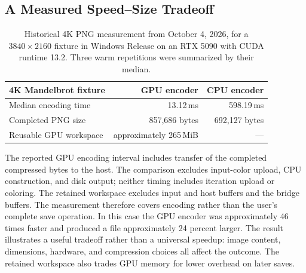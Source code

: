 \subsection{A Measured Speed--Size Tradeoff}
\label{subsec:png-benchmarks}

\begin{table}[htbp]
\centering
\begin{tabular}{lrr}
\hline
4K Mandelbrot fixture & GPU encoder & CPU encoder \\
\hline
Median encoding time & 13.12\,ms & 598.19\,ms \\
Completed PNG size & 857,686 bytes & 692,127 bytes \\
Reusable GPU workspace & approximately 265\,MiB & --- \\
\hline
\end{tabular}
\caption[Historical 4K PNG measurement]{Historical 4K PNG measurement from October 4, 2026,
for a $3840\times2160$ fixture in Windows Release on an RTX 5090 with CUDA runtime 13.2.
Three warm repetitions were summarized by their median.}
\label{tab:gpu-png-benchmarks}
\label{tab:png-current-benchmark}
\label{tab:png-compression-sizes}
\end{table}

The reported GPU encoding interval includes transfer of the completed compressed bytes to the
host. The comparison excludes input-color upload, CPU  construction, and disk
output; neither timing includes iteration upload or coloring. The retained workspace excludes
input and host buffers and the  bridge buffers. The measurement therefore
covers encoding rather than the user's complete save operation. In this case the GPU encoder
was approximately 46 times faster and produced a file approximately 24 percent larger.
The result illustrates a useful tradeoff rather than a universal speedup: image content,
dimensions, hardware, and compression choices all affect the outcome. The retained workspace
also trades GPU memory for lower overhead on later saves.
